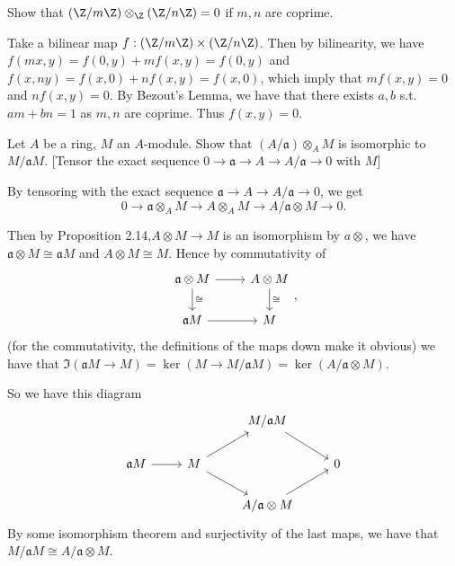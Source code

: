 \documentclass[a4paper]{exam}
\begin{document}
\begin{questions}
	\question Show that $(\Z / m\Z) \otimes _{\Z} (\Z/n\Z) = 0$ if $m,n$ are coprime.
	\begin{solution}
		Take a bilinear map $f: (\Z / m\Z) \times (\Z / n\Z)$.
		Then by bilinearity, we have $f(mx,y) = f(0,y) + mf(x,y) = f(0,y)$ and $f(x,ny) = f(x,0) + nf(x,y) = f(x,0) $, which imply that $mf(x,y) = 0$ and $nf(x,y) = 0$.
		By Bezout's Lemma, we have that there exists $a,b$ s.t. $am+bn = 1$ as $m,n$ are coprime.
		Thus $f(x,y) = 0$.
	\end{solution}

	\question Let $A$ be a ring, $M$ an $A$-module. Show that $(A / \mathfrak{a}) \otimes_A M$ is isomorphic to $M / \mathfrak{a}M$. [Tensor the exact sequence $0\to \mathfrak{a}\to A\to A / \mathfrak{a} \to 0$ with $M $]
	\begin{solution}
		By tensoring with the exact sequence $\mathfrak{a}\to A \to A / \mathfrak{a} \to 0 $, we get
		\[
			0 \to \mathfrak{a}\otimes_A M \to A \otimes_A M \to A / \mathfrak{a} \otimes M \to 0 \tag{Prop 2.8}
		.\]

		Then by Proposition 2.14,$A \otimes M \to M$ is an isomorphism by $a\otimes  $, we have $\mathfrak{a}\otimes M \cong \mathfrak{a}M$ and $A\otimes M \cong M$.
		Hence by commutativity of
		\[
			\begin{tikzcd}
				\mathfrak{a}\otimes M & A \otimes M\\
				\mathfrak{a}M & M
				\arrow[from=1-1,to=1-2]
				\arrow["\cong",from=1-1,to=2-1]
				\arrow[from=2-1,to=2-2]
				\arrow["\cong",from=1-2,to=2-2]
			\end{tikzcd}
		,\]
		(for the commutativity, the definitions of the maps down make it obvious) we have that $\Im(\mathfrak{a}M\to M)= \ker(M\to M / \mathfrak{a}M) = \ker(A / \mathfrak{a}\otimes M)$.

		So we have this diagram
		\[
			\begin{tikzcd}
				&& M / \mathfrak{a}M &\\
				\mathfrak{a}M & M &&0\\
					      && A / \mathfrak{a} \otimes M &
					      \arrow[from=2-1,to=2-2]
					      \arrow[from=2-2,to=1-3]
					      \arrow[from=2-2,to=3-3]
					      \arrow[from=3-3,to=2-4]
					      \arrow[from=1-3,to=2-4]
			\end{tikzcd}
		\]
		By some isomorphism theorem and surjectivity of the last maps, we have that $M / \mathfrak{a}M \cong A / \mathfrak{a} \otimes M$.
	\end{solution}


\end{questions}
\end{document}
